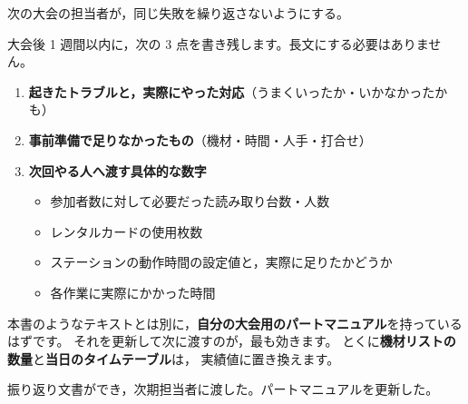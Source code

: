 
\begin{Goal}
次の大会の担当者が，同じ失敗を繰り返さないようにする。
\end{Goal}

大会後 1 週間以内に，次の 3 点を書き残します。長文にする必要はありません。

\begin{enumerate}
\item \textbf{起きたトラブルと，実際にやった対応}（うまくいったか・いかなかったかも）
\item \textbf{事前準備で足りなかったもの}（機材・時間・人手・打合せ）
\item \textbf{次回やる人へ渡す具体的な数字}
      \begin{itemize}
      \item 参加者数に対して必要だった読み取り台数・人数
      \item レンタルカードの使用枚数
      \item ステーションの動作時間の設定値と，実際に足りたかどうか
      \item 各作業に実際にかかった時間
      \end{itemize}
\end{enumerate}

\begin{Note}[パートマニュアルを更新する]
本書のようなテキストとは別に，\textbf{自分の大会用のパートマニュアル}を持っているはずです。
それを更新して次に渡すのが，最も効きます。
とくに\textbf{機材リストの数量}と\textbf{当日のタイムテーブル}は，
実績値に置き換えます。
\end{Note}

\begin{Done}
振り返り文書ができ，次期担当者に渡した。パートマニュアルを更新した。
\end{Done}
